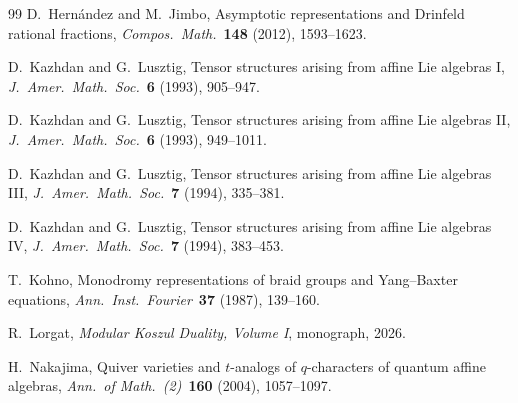 \documentclass[11pt,reqno]{amsart}
\theoremstyle{definition}
\theoremstyle{remark}
\numberwithin{equation}{section}
\begin{document}
\begin{thebibliography}{99}
D.~Hern\'andez and M.~Jimbo,
Asymptotic representations and Drinfeld rational fractions,
\textit{Compos.\ Math.}\ \textbf{148} (2012), 1593--1623.

D.~Kazhdan and G.~Lusztig,
Tensor structures arising from affine Lie algebras I,
\textit{J.\ Amer.\ Math.\ Soc.}\ \textbf{6} (1993), 905--947.

D.~Kazhdan and G.~Lusztig,
Tensor structures arising from affine Lie algebras II,
\textit{J.\ Amer.\ Math.\ Soc.}\ \textbf{6} (1993), 949--1011.

D.~Kazhdan and G.~Lusztig,
Tensor structures arising from affine Lie algebras III,
\textit{J.\ Amer.\ Math.\ Soc.}\ \textbf{7} (1994), 335--381.

D.~Kazhdan and G.~Lusztig,
Tensor structures arising from affine Lie algebras IV,
\textit{J.\ Amer.\ Math.\ Soc.}\ \textbf{7} (1994), 383--453.

T.~Kohno,
Monodromy representations of braid groups and Yang--Baxter
equations,
\textit{Ann.\ Inst.\ Fourier}\ \textbf{37} (1987), 139--160.

R.~Lorgat,
\textit{Modular Koszul Duality, Volume I},
monograph, 2026.

H.~Nakajima,
Quiver varieties and $t$-analogs of $q$-characters of quantum
affine algebras,
\textit{Ann.\ of Math.\ (2)}\ \textbf{160} (2004), 1057--1097.

\end{thebibliography}
\end{document}
